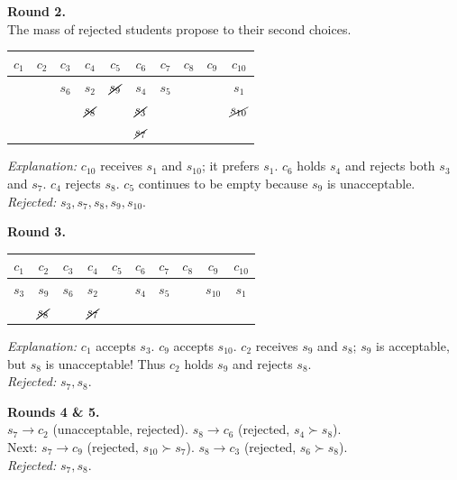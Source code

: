 {\medskip
\noindent\textbf{Round 2.} \\
The mass of rejected students propose to their second choices. 
\begin{center}
\renewcommand{\arraystretch}{1.2}
\begin{tabular}{cccccccccc}
    $c_1$ & $c_2$ & $c_3$ & $c_4$ & $c_5$ & $c_6$ & $c_7$ & $c_8$ & $c_9$ & $c_{10}$ \\
    \hline
     & & $s_6$ & $s_2$ & $\cancel{s_9}$ & $s_4$ & $s_5$ & & & $s_1$ \\
     & & & $\cancel{s_8}$ & & $\cancel{s_3}$ & & & & $\cancel{s_{10}}$ \\
     & & & & & $\cancel{s_7}$ & & & & \\
\end{tabular}
\end{center}
\textit{Explanation:} $c_{10}$ receives $s_1$ and $s_{10}$; it prefers $s_1$. $c_6$ holds $s_4$ and rejects both $s_3$ and $s_7$. $c_4$ rejects $s_8$. $c_5$ continues to be empty because $s_9$ is unacceptable. \\
\textit{Rejected:} $s_3, s_7, s_8, s_9, s_{10}$.

\medskip
\noindent\textbf{Round 3.} \\
\begin{center}
\renewcommand{\arraystretch}{1.2}
\begin{tabular}{cccccccccc}
    $c_1$ & $c_2$ & $c_3$ & $c_4$ & $c_5$ & $c_6$ & $c_7$ & $c_8$ & $c_9$ & $c_{10}$ \\
    \hline
    $s_3$ & $s_9$ & $s_6$ & $s_2$ & & $s_4$ & $s_5$ & & $s_{10}$ & $s_1$ \\
     & $\cancel{s_8}$ & & $\cancel{s_7}$ & & & & & & \\
\end{tabular}
\end{center}
\textit{Explanation:} $c_1$ accepts $s_3$. $c_9$ accepts $s_{10}$. $c_2$ receives $s_9$ and $s_8$; $s_9$ is acceptable, but $s_8$ is unacceptable! Thus $c_2$ holds $s_9$ and rejects $s_8$. \\
\textit{Rejected:} $s_7, s_8$.

\medskip
\noindent\textbf{Rounds 4 \& 5.} \\
$s_7 \to c_2$ (unacceptable, rejected). $s_8 \to c_6$ (rejected, $s_4 \succ s_8$). \\
Next: $s_7 \to c_9$ (rejected, $s_{10} \succ s_7$). $s_8 \to c_3$ (rejected, $s_6 \succ s_8$). \\
\textit{Rejected:} $s_7, s_8$.

}
